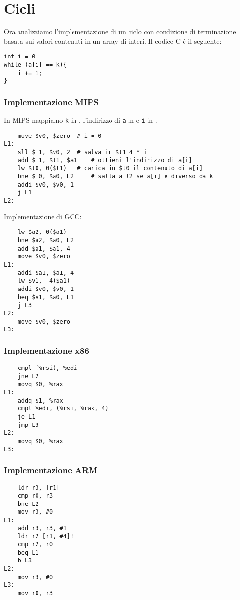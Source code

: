 \documentclass[class=book, crop=false, oneside]{standalone}
\begin{document}
\section{Cicli}
Ora analizziamo l'implementazione di un ciclo con condizione di terminazione basata sui valori contenuti in un array di interi. Il codice C è il seguente:
\begin{verbatim}
int i = 0;
while (a[i] == k){
	i += 1;
}
\end{verbatim}

\subsubsection*{Implementazione MIPS}
In MIPS mappiamo \texttt{k} in , l'indirizzo di \texttt{a} in e \texttt{i} in .

\begin{verbatim}
	move $v0, $zero	 # i = 0
L1:
	sll $t1, $v0, 2	 # salva in $t1 4 * i
	add $t1, $t1, $a1	 # ottieni l'indirizzo di a[i]
	lw $t0, 0($t1)	 # carica in $t0 il contenuto di a[i]
	bne $t0, $a0, L2	 # salta a l2 se a[i] è diverso da k
	addi $v0, $v0, 1
	j L1
L2:
\end{verbatim}

Implementazione di GCC:
\begin{verbatim}
	lw $a2, 0($a1)
	bne $a2, $a0, L2
	add $a1, $a1, 4
	move $v0, $zero
L1:
	addi $a1, $a1, 4
	lw $v1, -4($a1)
	addi $v0, $v0, 1
	beq $v1, $a0, L1
	j L3
L2:
	move $v0, $zero
L3:
\end{verbatim}

\subsubsection*{Implementazione x86}
\begin{verbatim}
	cmpl (%rsi), %edi
	jne L2
	movq $0, %rax
L1:
	addq $1, %rax
	cmpl %edi, (%rsi, %rax, 4)
	je L1
	jmp L3
L2:
	movq $0, %rax
L3:
\end{verbatim}

\subsubsection*{Implementazione ARM}
\begin{verbatim}
	ldr r3, [r1]
	cmp r0, r3
	bne L2
	mov r3, #0
L1:
	add r3, r3, #1
	ldr r2 [r1, #4]!
	cmp r2, r0
	beq L1
	b L3
L2:
	mov r3, #0
L3:
	mov r0, r3
\end{verbatim}
\end{document}
